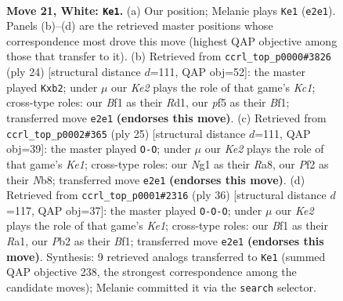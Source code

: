 \documentclass[11pt]{article}
\begin{document}
\begin{figure}[p]
\label{fig:thought-m38}
\end{figure}

\clearpage

\begin{figure}[p]\centering
\begin{subfigure}{0.46\textwidth}\centering
\resizebox{\linewidth}{!}{%
\newchessgame
\chessboard[
  setfen={r3k1nr/bpq5/4p3/p3Pp2/b1pn1QPp/P7/RP1NKPP1/2B2BNR w kq - 1 21},
  showmover=false,
  pgfstyle=straightmove, color=movearrow, markmove={e2-e1}
]}
\caption{}
\end{subfigure}\hfill
\begin{subfigure}{0.46\textwidth}\centering
\resizebox{\linewidth}{!}{%
\newchessgame
\chessboard[
  setfen={rnbqk2r/p3Pppp/2p1pn2/8/3P1B2/4QP2/PpP3PP/2KR1BNR w kq - 0 13},
  showmover=false,
  pgfstyle=straightmove, color=movearrow, markmove={c1-b2}
]}
\caption{}
\end{subfigure}
\\[4pt]
\begin{subfigure}{0.46\textwidth}\centering
\resizebox{\linewidth}{!}{%
\newchessgame
\chessboard[
  setfen={rn2k2r/1bq1bppp/p2p1n2/3P4/p2N2P1/7P/1PP2PB1/R1BQR1K1 b kq - 0 13},
  showmover=false,
  pgfstyle=straightmove, color=movearrow, markmove={e8-g8}
]}
\caption{}
\end{subfigure}\hfill
\begin{subfigure}{0.46\textwidth}\centering
\resizebox{\linewidth}{!}{%
\newchessgame
\chessboard[
  setfen={r1b1qrk1/7p/p1pp1np1/n5B1/NpP1PP2/8/PP1Q2P1/R3KB1R w KQ - 2 19},
  showmover=false,
  pgfstyle=straightmove, color=movearrow, markmove={e1-c1}
]}
\caption{}
\end{subfigure}
\caption{\textbf{Move 21, White: \texttt{Ke1}.} (a) Our position; Melanie plays \texttt{Ke1} (\texttt{e2e1}). Panels (b)--(d) are the retrieved master positions whose correspondence most drove this move (highest QAP objective among those that transfer to it). (b) Retrieved from \texttt{ccrl\_top\_p0000\#3826} (ply 24) [structural distance $d$=111, QAP obj=52]: the master played \texttt{Kxb2}; under $\mu$ our \emph{Ke2} plays the role of that game's \emph{Kc1}; cross-type roles: our \emph{B}f1 as their \emph{R}d1, our \emph{p}f5 as their \emph{B}f1; transferred move \texttt{e2e1} \textbf{(endorses this move)}. (c) Retrieved from \texttt{ccrl\_top\_p0002\#365} (ply 25) [structural distance $d$=111, QAP obj=39]: the master played \texttt{O-O}; under $\mu$ our \emph{Ke2} plays the role of that game's \emph{Ke1}; cross-type roles: our \emph{N}g1 as their \emph{R}a8, our \emph{P}f2 as their \emph{N}b8; transferred move \texttt{e2e1} \textbf{(endorses this move)}. (d) Retrieved from \texttt{ccrl\_top\_p0001\#2316} (ply 36) [structural distance $d$=117, QAP obj=37]: the master played \texttt{O-O-O}; under $\mu$ our \emph{Ke2} plays the role of that game's \emph{Ke1}; cross-type roles: our \emph{B}f1 as their \emph{R}a1, our \emph{P}b2 as their \emph{B}f1; transferred move \texttt{e2e1} \textbf{(endorses this move)}. Synthesis: 9 retrieved analogs transferred to \texttt{Ke1} (summed QAP objective 238, the strongest correspondence among the candidate moves); Melanie committed it via the \texttt{search} selector.}

\end{figure}
\end{document}
